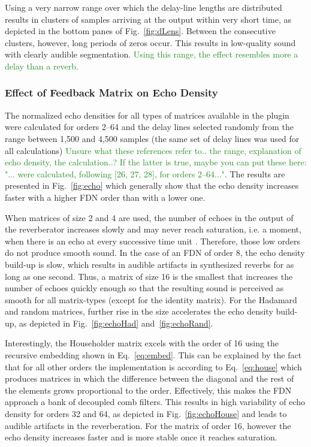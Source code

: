 \documentclass[twoside,a4paper]{article}
\newcommand{\silvin}[1]{\textcolor{ForestGreen}{#1}}
\begin{document}
Using a very narrow range over which the delay-line lengths are distributed results in clusters of samples arriving at the output within very short time, as depicted in the bottom panes of Fig.~\ref{fig:dLens}. Between the consecutive clusters, however, long periods of zeros occur. This results in low-quality sound with clearly audible segmentation. \silvin{Using this range, the effect resembles more a delay than a reverb.}

\subsubsection{Effect of Feedback Matrix on Echo Density}

The normalized echo densities for all types of matrices available in the plugin were calculated for orders 2--64 and the delay lines selected randomly %
from the range between 1,500 and 4,500 samples (the same set of delay lines was used for all calculations) \cite{abel:2006, huang:2007, huang:2008} \silvin{Unsure what these references refer to.. the range, explanation of echo density, the calculation..? If the latter is true, maybe you can put these here: "... were calculated, following [26, 27, 28], for orders 2--64..."}. The results are presented in Fig.~\ref{fig:echo} which generally show that the echo density increases faster with a higher FDN order than with a lower one. 

When matrices of size 2 and 4 are used, the number of echoes in the output of the reverberator increases slowly and may never reach saturation, i.e. a moment, when there is an echo at every successive time unit \cite{schlecht:2016:echo}. Therefore, those low orders do not produce smooth sound. In the case of an FDN of order 8, the echo density build-up is slow, which results in audible artifacts in synthesized reverbs for as long as one second. Thus, a matrix of size 16 is the smallest that increases the number of echoes quickly enough so that the resulting sound is perceived as smooth for all matrix-types (except for the identity matrix). For the Hadamard and random matrices, further rise in the size accelerates the echo density build-up, as depicted in Fig.~\ref{fig:echoHad} and~\ref{fig:echoRand}.

Interestingly, the Householder matrix excels with the order of 16 using the recursive embedding shown in Eq.~\eqref{eq:embed}. This can be explained by the fact that for all other orders the implementation is according to Eq.~\eqref{eq:house} which produces matrices in which the difference between the diagonal and the rest of the elements grows proportional to the order. Effectively, this makes the FDN approach a bank of decoupled comb filters. This results in high variability of echo density for orders 32 and 64, as depicted in Fig.~\ref{fig:echoHouse} and leads to audible artifacts in the reverberation. For the matrix of order 16, however the echo density increases faster and is more stable once it reaches saturation.
\end{document}
